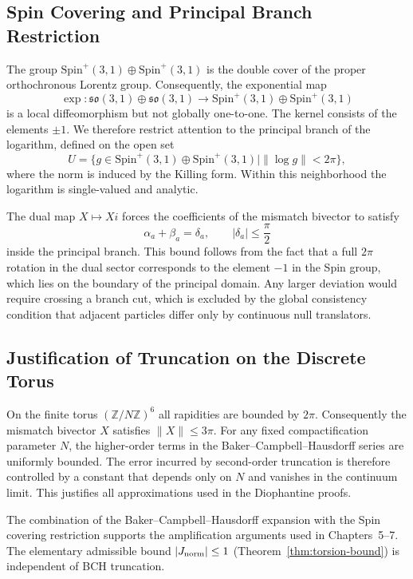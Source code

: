\documentclass[dvipdfmx,a4paper]{article}
\theoremstyle{definition}
\theoremstyle{remark}
\newcommand{\Jnorm}{J_{\rm norm}}
\begin{document}
\subsection{Spin Covering and Principal Branch Restriction}

The group \( \mathrm{Spin}^+(3,1) \oplus \mathrm{Spin}^+(3,1) \) is the double cover of the proper orthochronous Lorentz group. Consequently, the exponential map
\[
\exp : \mathfrak{so}(3,1) \oplus \mathfrak{so}(3,1) \to \mathrm{Spin}^+(3,1) \oplus \mathrm{Spin}^+(3,1)
\]
is a local diffeomorphism but not globally one-to-one. The kernel consists of the elements \( \pm 1 \). We therefore restrict attention to the principal branch of the logarithm, defined on the open set
\[
U = \{ g \in \mathrm{Spin}^+(3,1) \oplus \mathrm{Spin}^+(3,1) \mid \| \log g \| < 2\pi \},
\]
where the norm is induced by the Killing form. Within this neighborhood the logarithm is single-valued and analytic.

The dual map \( X \mapsto Xi \) forces the coefficients of the mismatch bivector to satisfy
\[
\alpha_a + \beta_a = \delta_a, \qquad |\delta_a| \leq \frac{\pi}{2}
\]
inside the principal branch. This bound follows from the fact that a full \( 2\pi \) rotation in the dual sector corresponds to the element \( -1 \) in the Spin group, which lies on the boundary of the principal domain. Any larger deviation would require crossing a branch cut, which is excluded by the global consistency condition that adjacent particles differ only by continuous null translators.

\subsection{Justification of Truncation on the Discrete Torus}

On the finite torus \( (\mathbb{Z}/N\mathbb{Z})^6 \) all rapidities are bounded by \( 2\pi \). Consequently the mismatch bivector \( X \) satisfies \( \|X\| \leq 3\pi \). For any fixed compactification parameter \( N \), the higher-order terms in the Baker--Campbell--Hausdorff series are uniformly bounded. The error incurred by second-order truncation is therefore controlled by a constant that depends only on \( N \) and vanishes in the continuum limit. This justifies all approximations used in the Diophantine proofs.

The combination of the Baker--Campbell--Hausdorff expansion with the Spin covering restriction supports the amplification arguments used in Chapters~5--7. The elementary admissible bound \(|\Jnorm| \leq 1\) (Theorem~\ref{thm:torsion-bound}) is independent of BCH truncation.
\end{document}
